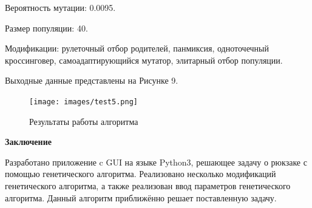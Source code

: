 \documentclass{article}
\begin{document}
\begin{enumerate}
Вероятность мутации: 0.0095.

Размер популяции: 40.

Модификации: рулеточный отбор родителей, панмиксия, одноточечный кроссинговер, самоадаптирующийся мутатор, элитарный отбор популяции.

Выходные данные представлены на Рисунке 9.
\begin{figure}[h!]
\centering
\texttt{[image: images/test5.png]}
\caption{Результаты работы алгоритма}
\label{fig:mpr}
\end{figure}

\newpage

\textbf{Заключение}

Разработано приложение c GUI на языке Python3, решающее задачу о рюкзаке с помощью генетического алгоритма. Реализовано несколько модификаций генетического алгоритма, а также реализован ввод параметров генетического алгоритма. Данный алгоритм приближённо решает поставленную задачу.
\end{enumerate}
\end{document}
